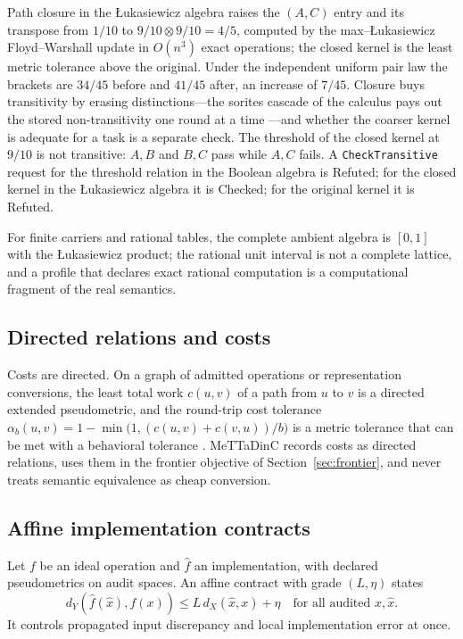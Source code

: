 \documentclass[11pt]{article}
\newcommand{\code}[1]{\texttt{#1}}
\newcommand{\Lt}{\otimes}
\theoremstyle{definition}
\theoremstyle{plain}
\begin{document}
Path closure in the \L{}ukasiewicz algebra raises the $(A,C)$ entry and its transpose from $1/10$
to $9/10\Lt9/10=4/5$, computed by the max--\L{}ukasiewicz Floyd--Warshall update in $O(n^3)$ exact
operations; the closed kernel is the least metric tolerance above the original. Under the
independent uniform pair law the brackets are $34/45$ before and $41/45$ after, an increase of
$7/45$. Closure buys transitivity by erasing distinctions---the sorites cascade of the calculus pays
out the stored non-transitivity one round at a time \cite{dclosure}---and whether the coarser kernel
is adequate for a task is a separate check. The threshold of the closed kernel at $9/10$ is not
transitive: $A,B$ and $B,C$ pass while $A,C$ fails. A \code{CheckTransitive} request for the
threshold relation in the Boolean algebra is Refuted; for the closed kernel in the
\L{}ukasiewicz algebra it is Checked; for the original kernel it is Refuted.

For finite carriers and rational tables, the complete ambient algebra is $[0,1]$ with the
\L{}ukasiewicz product; the rational unit interval is not a complete lattice, and a profile that
declares exact rational computation is a computational fragment of the real semantics.

\subsection{Directed relations and costs}

Costs are directed. On a graph of admitted operations or representation conversions, the least
total work $c(u,v)$ of a path from $u$ to $v$ is a directed extended pseudometric, and the
round-trip cost tolerance $\alpha_b(u,v)=1-\min\bigl(1,(c(u,v)+c(v,u))/b\bigr)$ is a metric tolerance
that can be met with a behavioral tolerance \cite{codd}. MeTTaDinC records costs as directed
relations, uses them in the frontier objective of Section~\ref{sec:frontier}, and never treats
semantic equivalence as cheap conversion.

\subsection{Affine implementation contracts}\label{sec:affine}

Let $f$ be an ideal operation and $\hat f$ an implementation, with declared pseudometrics on audit
spaces. An affine contract with grade $(L,\eta)$ states
\[
d_Y(\hat f(\hat x),f(x))\le L\,d_X(\hat x,x)+\eta\quad\text{for all audited }x,\hat x .
\]
It controls propagated input discrepancy and local implementation error at once.
\end{document}
